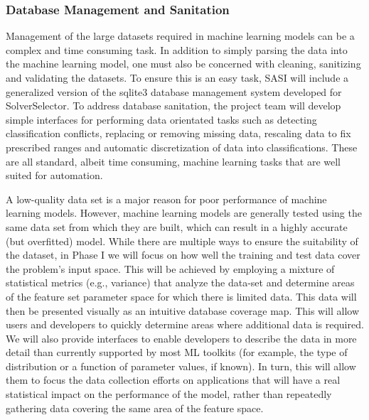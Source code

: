 \subsubsection{Database Management and Sanitation} Management of the large datasets required in machine learning models can be a complex and time consuming task. In addition to simply parsing the data into the machine learning model, one must also be concerned with cleaning, sanitizing and validating the datasets. To ensure this is an easy task, SASI will include a generalized version of the sqlite3 database management system developed for SolverSelector. To address database sanitation, the project team will develop simple interfaces for performing data orientated tasks such as detecting classification conflicts, replacing or removing missing data, rescaling data to fix prescribed ranges and automatic discretization of data into classifications. These are all standard, albeit time consuming, machine learning tasks that are well suited for automation. 

A low-quality data set is a major reason for poor performance of machine learning models. However, machine learning models are generally tested using the same data set from which they are built, which can result in a highly accurate (but overfitted) model.  While there are multiple ways to ensure the suitability of the dataset, in Phase I we will focus on how well the training and test data cover the problem's input space.  This will be achieved by employing a mixture of statistical metrics (e.g., variance) that analyze the data-set and determine areas of the feature set parameter space for which there is limited data. This data will then be presented visually as an intuitive database coverage map. This will allow users and developers to quickly determine areas where additional data is required. We will also provide interfaces to enable developers to describe the data in more detail than currently supported by most ML toolkits (for example, the type of distribution or a function of parameter values, if known). In turn, this will allow them to focus the data collection efforts on applications that will have a real statistical impact on the performance of the model, rather than repeatedly gathering data covering the same area of the feature space. 

